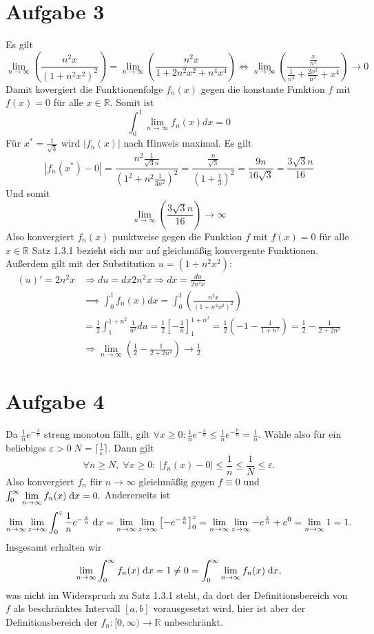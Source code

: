 \documentclass{article}
\theoremstyle{definition}
\newcommand{\R}{\mathbb{R}}
\renewcommand{\epsilon}{\varepsilon}
\begin{document}
\section*{Aufgabe 3}
	Es gilt $$\lim\limits_{n\to\infty}\left(\frac{n^2x}{(1+n^2x^2)^2}\right)=\lim\limits_{n\to\infty}\left(\frac{n^2x}{1+2n^2x^2+n^4x^4}\right) \Leftrightarrow \lim\limits_{n\to\infty}\left(\frac{\frac{x}{n^2}}{\frac{1}{n^4}+\frac{2x^2}{n^2}+x^4}\right)\longrightarrow 0$$
	Damit kovergiert die Funktionenfolge $f_n(x)$ gegen die konstante Funktion $f$ mit$f(x)=0$ für alle $x\in\R$.
	Somit ist $$\int_{0}^{1}\lim\limits_{n\to\infty}f_n(x)dx= 0$$
	Für $x^{*}=\frac{1}{\sqrt{3}}$ wird $|f_n(x)|$ nach Hinweis maximal. Es gilt 
	$$|f_n(x^{*})-0|=\frac{n^2\frac{1}{\sqrt{3}n}}{(1^2+n^2\frac{1}{3n^2})^2}=\frac{\frac{n}{\sqrt{3}}}{(1+\frac{1}{3})^2}=\frac{9n}{16\sqrt{3}}=\frac{3\sqrt{3}n}{16}$$
	Und somit 
	$$\lim\limits_{n\to\infty}\left(\frac{3\sqrt{3}n}{16}\right)\longrightarrow \infty$$
	Also konvergiert $f_n(x)$ punktweise gegen die Funktion $f$ mit $f(x)=0$ für alle $x\in \R$
	Satz 1.3.1 bezieht sich nur auf gleichmäßig konvergente Funktionen.\\
	Außerdem gilt mit der Substitution $u=(1+n^2x^2)$:
	\begin{align*}
		(u)'= 2n^2x &\Rightarrow du = dx2n^2x \Rightarrow dx=\frac{du}{2n^2x}\\
		&\implies\int_{0}^{1}f_n(x)dx=\int_{0}^{1}\left(\frac{n^2x}{(1+n^2x^2)^2}\right)\\
		&= \frac{1}{2}\int_{1}^{1+n^2}\frac{1}{u^2}du=\frac{1}{2}[-\frac{1}{u}]_{1}^{1+n^2}=\frac{1}{2}\left(-1-\frac{1}{1+n^2}\right)=\frac{1}{2}-\frac{1}{2+2n^2}\\
		&\Rightarrow \lim\limits_{n\to\infty}\left(\frac{1}{2}-\frac{1}{2+2n^2}\right)\rightarrow \frac{1}{2}
	\end{align*}
	
	

\section*{Aufgabe 4}
Da $\frac{1}{n} e^{-\frac{x}{n}}$ streng monoton fällt, gilt $\forall x \geq 0: \frac{1}{n}e^{-\frac{x}{n}} \leq\frac{1}{n}e^{-\frac{0}{n}} = \frac{1}{n}$. Wähle also für ein beliebiges $\epsilon > 0\; N = \lceil\frac{1}{\epsilon}\rceil$. Dann gilt
$$\forall n \geq N,\; \forall x \geq 0:\; |f_n(x) - 0| \leq \frac{1}{n} \leq \frac{1}{N} \leq \epsilon.$$
Also konvergiert $f_n$ für $n \to \infty$ gleichmäßig gegen $f \equiv 0$ und $\int_0^\infty \lim\limits_{n\to\infty}f_n(x)\d x = 0.$ Andererseits ist $$\lim\limits_{n\to\infty}\lim\limits_{z\to\infty}\int_0^z \frac{1}{n} e^{-\frac{x}{n}} \d x = \lim\limits_{n\to\infty}\lim\limits_{z\to\infty} \left[-e^{-\frac{x}{n}}\right]_0^z = \lim\limits_{n\to\infty}\lim\limits_{z\to\infty} - e^{\frac{z}{n}} + e^0 = \lim\limits_{n\to\infty} 1 = 1.$$
Insgesamt erhalten wir
$$\lim\limits_{n\to\infty}\int_0^\infty f_n(x) \d x = 1 \neq 0 = \int_0^\infty \lim\limits_{n\to\infty}f_n(x)\d x,$$ was nicht im Widerspruch zu Satz 1.3.1 steht, da dort der Definitionsbereich von $f$ als beschränktes Intervall $[a,b]$ vorausgesetzt wird, hier ist aber der Definitionsbereich der $f_n: [0, \infty) \to \R$ unbeschränkt.
\end{document}
